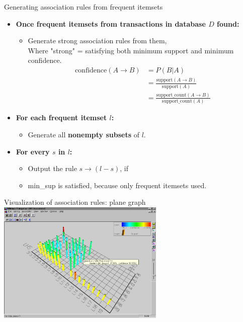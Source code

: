 \documentclass[aspectratio=169,t,xcolor=dvipsnames]{beamer}
\begin{document}
  {
    \begin{frame}{Generating association rules from frequent itemsets}
        \begin{itemize}
            \item \textbf{Once frequent itemsets from transactions in database $D$ found:}
            \begin{itemize}
              \item Generate strong association rules from them,\\
                    Where "strong" = satisfying both minimum support and minimum confidence.
                    \begin{align}
                      \text{confidence}(A \rightarrow B) &= P(B|A)\\
                      &= \frac{\text{support}(A \rightarrow B)}{\text{support}(A)}\\
                      &= \frac{\text{support\_count}(A \rightarrow B)}{\text{support\_count}(A)}
                    \end{align}
            \end{itemize}
            \item \textbf{For each frequent itemset $l$:}
            \begin{itemize}
              \item Generate all \textbf{nonempty subsets} of $l$.
            \end{itemize}
            \item \textbf{For every $s$ in $l$:}
            \begin{itemize}
              \item Output the rule $s \rightarrow (l - s)$, if
              \item min\_sup is satisfied, because only frequent itemsets used.
            \end{itemize}
        \end{itemize}
    \end{frame}
  }

  {
    \begin{frame}{Visualization of association rules: plane graph}
    \includegraphics[width=0.6\textwidth]{img/assoc_rules1.jpg}
    \end{frame}
  }
\end{document}
